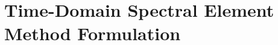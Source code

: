 
\chapter[Time-Domain Spectral Element Method Formulation]{Time-Domain Spectral Element Method Formulation}
\label{ch:sem}











